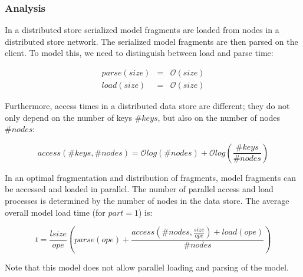 \subsubsection{Analysis}
In a distributed store serialized model fragments are loaded from nodes in a distributed store network. The serialized model fragments are then parsed on the client. To model this, we need to distinguish between load and parse time:

\begin{eqnarray*}
parse(size)&=&\mathcal{O}(size)\\
load(size)&=&\mathcal{O}(size)
\end{eqnarray*}

Furthermore, access times in a distributed data store are different; they do not only depend on the number of keys $\#keys$, but also on the number of nodes $\#nodes$:

$$access(\#keys, \#nodes)=\mathcal{O}log(\#nodes)+\mathcal{O}log(\frac{\#keys}{\#nodes})$$

In an optimal fragmentation and distribution of fragments, model fragments can be accessed and loaded in parallel. The number of parallel access and load processes is determined by the number of nodes in the data store. The average overall model load time (for $part=1$) is:

$$t=\frac{lsize}{ope}\left(parse(ope)+\frac{access(\#nodes,\frac{size}{ope})+load(ope)}{\#nodes}\right)$$

Note that this model does not allow parallel loading and parsing of the model. 